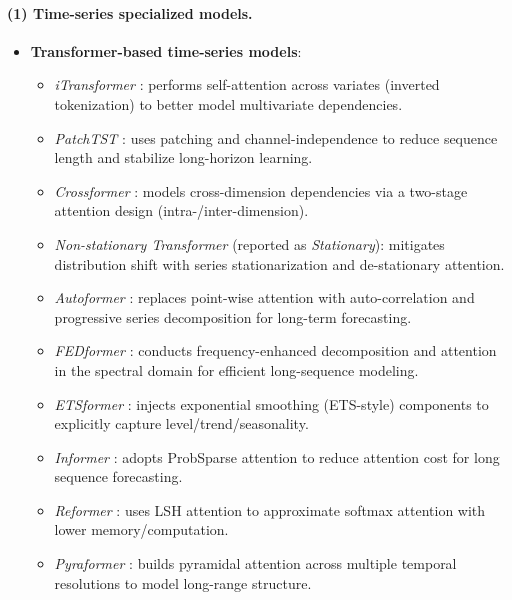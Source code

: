 \paragraph{(1) Time-series specialized models.}
\begin{itemize}[leftmargin=*, itemsep=2pt]
\item \textbf{Transformer-based time-series models}:
\begin{itemize}[leftmargin=*, itemsep=1pt]
\item \textit{iTransformer} \citep{liu2023itransformer}: performs self-attention across variates (inverted tokenization) to better model multivariate dependencies.
\item \textit{PatchTST} \citep{nie2023patchtst}: uses patching and channel-independence to reduce sequence length and stabilize long-horizon learning.
\item \textit{Crossformer} \citep{zhang2023crossformer}: models cross-dimension dependencies via a two-stage attention design (intra-/inter-dimension).
\item \textit{Non-stationary Transformer} \citep{liu2022non} (reported as \textit{Stationary}): mitigates distribution shift with series stationarization and de-stationary attention.
\item \textit{Autoformer} \citep{wu2021autoformer}: replaces point-wise attention with auto-correlation and progressive series decomposition for long-term forecasting.
\item \textit{FEDformer} \citep{zhou2022fedformer}: conducts frequency-enhanced decomposition and attention in the spectral domain for efficient long-sequence modeling.
\item \textit{ETSformer} \citep{woo2022etsformer}: injects exponential smoothing (ETS-style) components to explicitly capture level/trend/seasonality.
\item \textit{Informer} \citep{zhou2021informer}: adopts ProbSparse attention to reduce attention cost for long sequence forecasting.
\item \textit{Reformer} \citep{kitaev2020reformer}: uses LSH attention to approximate softmax attention with lower memory/computation.
\item \textit{Pyraformer} \citep{liu2022pyraformer}: builds pyramidal attention across multiple temporal resolutions to model long-range structure.
\end{itemize}


\end{itemize}
